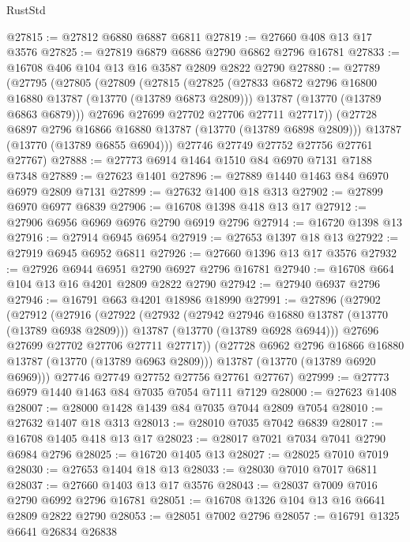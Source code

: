 \begin{lexlean}{RustStd}
\begin{coremodule}
@27815 := @27812 @6880 @6887 @6811
@27819 := @27660 @408 @13 @17 @3576
@27825 := @27819 @6879 @6886 @2790 @6862 @2796 @16781
@27833 := @16708 @406 @104 @13 @16 @3587 @2809 @2822 @2790
@27880 := @27789
    (@27795
      (@27805
        (@27809
          (@27815
            (@27825
              (@27833 @6872 @2796 @16800 @16880 @13787 (@13770 (@13789 @6873 @2809)))
              @13787
              (@13770 (@13789 @6863 @6879)))
            @27696
            @27699
            @27702
            @27706
            @27711
            @27717))
        (@27728 @6897 @2796 @16866 @16880 @13787 (@13770 (@13789 @6898 @2809)))
        @13787
        (@13770 (@13789 @6855 @6904)))
      @27746
      @27749
      @27752
      @27756
      @27761
      @27767)
@27888 := @27773 @6914 @1464 @1510 @84 @6970 @7131 @7188 @7348
@27889 := @27623 @1401
@27896 := @27889 @1440 @1463 @84 @6970 @6979 @2809 @7131
@27899 := @27632 @1400 @18 @313
@27902 := @27899 @6970 @6977 @6839
@27906 := @16708 @1398 @418 @13 @17
@27912 := @27906 @6956 @6969 @6976 @2790 @6919 @2796
@27914 := @16720 @1398 @13
@27916 := @27914 @6945 @6954
@27919 := @27653 @1397 @18 @13
@27922 := @27919 @6945 @6952 @6811
@27926 := @27660 @1396 @13 @17 @3576
@27932 := @27926 @6944 @6951 @2790 @6927 @2796 @16781
@27940 := @16708 @664 @104 @13 @16 @4201 @2809 @2822 @2790
@27942 := @27940 @6937 @2796
@27946 := @16791 @663 @4201 @18986 @18990
@27991 := @27896
    (@27902
      (@27912
        (@27916
          (@27922
            (@27932
              (@27942 @27946 @16880 @13787 (@13770 (@13789 @6938 @2809)))
              @13787
              (@13770 (@13789 @6928 @6944)))
            @27696
            @27699
            @27702
            @27706
            @27711
            @27717))
        (@27728 @6962 @2796 @16866 @16880 @13787 (@13770 (@13789 @6963 @2809)))
        @13787
        (@13770 (@13789 @6920 @6969)))
      @27746
      @27749
      @27752
      @27756
      @27761
      @27767)
@27999 := @27773 @6979 @1440 @1463 @84 @7035 @7054 @7111 @7129
@28000 := @27623 @1408
@28007 := @28000 @1428 @1439 @84 @7035 @7044 @2809 @7054
@28010 := @27632 @1407 @18 @313
@28013 := @28010 @7035 @7042 @6839
@28017 := @16708 @1405 @418 @13 @17
@28023 := @28017 @7021 @7034 @7041 @2790 @6984 @2796
@28025 := @16720 @1405 @13
@28027 := @28025 @7010 @7019
@28030 := @27653 @1404 @18 @13
@28033 := @28030 @7010 @7017 @6811
@28037 := @27660 @1403 @13 @17 @3576
@28043 := @28037 @7009 @7016 @2790 @6992 @2796 @16781
@28051 := @16708 @1326 @104 @13 @16 @6641 @2809 @2822 @2790
@28053 := @28051 @7002 @2796
@28057 := @16791 @1325 @6641 @26834 @26838

\end{coremodule}
\end{lexlean}
